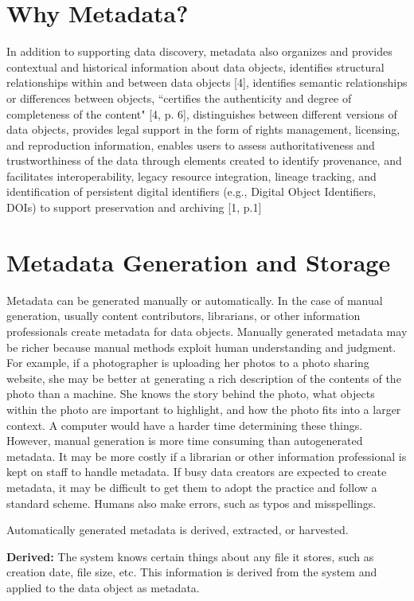 \documentclass[10pt,oneside]{memoir}
\begin{document}
\section{Why Metadata?}

In addition to supporting data discovery, metadata also organizes and provides contextual and historical information about data objects, identifies structural relationships within and between data objects [4], identifies semantic relationships or differences between objects, ``certifies the authenticity and degree of completeness of the content" [4, p. 6], distinguishes between different versions of data objects, provides legal support in the form of rights management, licensing, and reproduction information, enables users to assess authoritativeness and trustworthiness of the data through elements created to identify provenance, and facilitates interoperability, legacy resource integration, lineage tracking, and identification of persistent digital identifiers (e.g., Digital Object Identifiers, DOIs) to support preservation and archiving [1, p.1]

\section{Metadata Generation and Storage}

Metadata can be generated manually or automatically. In the case of manual generation, usually content contributors, librarians, or other information professionals create metadata for data objects. Manually generated metadata may be richer because manual methods exploit human understanding and judgment. For example, if a photographer is uploading her photos to a photo sharing website, she may be better at generating a rich description of the contents of the photo than a machine. She knows the story behind the photo, what objects within the photo are important to highlight, and how the photo fits into a larger context. A computer would have a harder time determining these things. However, manual generation is more time consuming than autogenerated metadata. It may be more costly if a librarian or other information professional is kept on staff to handle metadata. If busy data creators are expected to create metadata, it may be difficult to get them to adopt the practice and follow a standard scheme. Humans also make errors, such as typos and misspellings.

Automatically generated metadata is derived, extracted, or harvested.

\textbf{Derived:} The system knows certain things about any file it stores, such as creation date, file size, etc. This information is derived from the system and applied to the data object as metadata.
\end{document}
